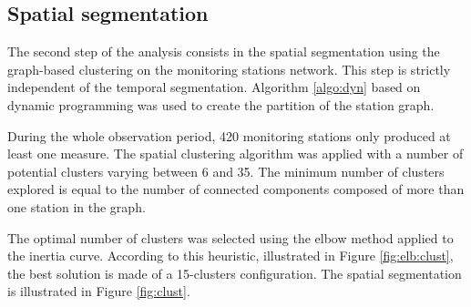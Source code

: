 


\subsection{Spatial segmentation}\label{section:clust129}

The second step of the analysis consists in the spatial segmentation using the graph-based clustering on the monitoring stations network. This step is strictly independent of the temporal segmentation. Algorithm \ref{algo:dyn} based on dynamic programming was used to create the partition of the station graph.


During the whole observation period, 420 monitoring stations only produced at least one measure. The spatial clustering algorithm was applied with a number of potential clusters varying between 6 and 35. The minimum number of clusters explored is equal to the number of connected components composed of more than one station in the graph. 

The optimal number of clusters was selected using the elbow method applied to the inertia curve. According to this heuristic, illustrated in Figure \ref{fig:elb:clust}, the best solution is made of a 15-clusters configuration. The spatial segmentation is illustrated in Figure \ref{fig:clust}.

